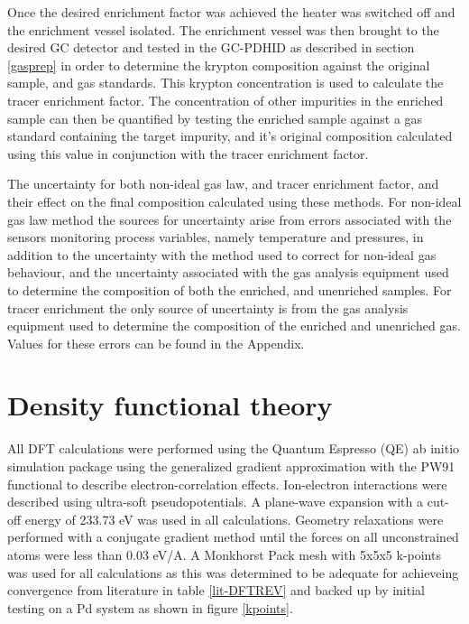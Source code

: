 Once the desired enrichment factor was achieved the heater was switched off and the enrichment vessel isolated. The enrichment vessel was then brought to the desired GC detector and tested in the GC-PDHID as described in section \ref{gasprep} in order to determine the krypton composition against the original sample, and gas standards. This krypton concentration is used to calculate the tracer enrichment factor. The concentration of other impurities in the enriched sample can then be quantified by testing the enriched sample against a gas standard containing the target impurity, and it's original composition calculated using this value in conjunction with the tracer enrichment factor. 

The uncertainty for both non-ideal gas law, and tracer enrichment factor, and their effect on the final composition calculated using these methods. For non-ideal gas law method the sources for uncertainty arise from errors associated with the sensors monitoring process variables, namely temperature and pressures, in addition to the uncertainty with the method used to correct for non-ideal gas behaviour, and the uncertainty associated with the gas analysis equipment used to determine the composition of both the enriched, and unenriched samples. For tracer enrichment the only source of uncertainty is from the gas analysis equipment used to determine the composition of the enriched and unenriched gas. Values for these errors can be found in the Appendix. 

\section{Density functional theory} \label{DFTparams}
All DFT calculations were performed using the Quantum Espresso (QE) \cite{QE-2009, QE-2017, doi:10.1063/5.0005082} ab initio simulation package using the generalized gradient approximation with the PW91 functional to describe electron-correlation effects. Ion-electron interactions were described using ultra-soft pseudopotentials. A plane-wave expansion with a cut-off energy of 233.73 eV was used in all calculations. Geometry relaxations were performed with a conjugate gradient method until the forces on all unconstrained atoms were less than 0.03 eV/A. A Monkhorst Pack mesh with 5x5x5 k-points was used for all calculations as this was determined to be adequate for achieveing convergence from literature in table \ref{lit-DFTREV} and backed up by initial testing on a Pd system as shown in figure \ref{kpoints}.


